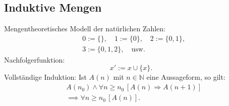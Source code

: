 \subsection{Induktive Mengen}
Mengentheoretisches Modell der natürlichen Zahlen:
\begin{equation}
\begin{split}
& 0:=\{\},\quad 1:=\{0\},\quad 2:=\{0,1\},\\
& 3:=\{0,1,2\},\quad \text{usw.}
\end{split}
\end{equation}
Nachfolgerfunktion:
\begin{equation}
x' := x\cup\{x\}.
\end{equation}
Vollständige Induktion: Ist $A(n)$ mit $n\in\mathbb N$
eine Aussageform, so gilt:
\begin{equation}
\begin{split}
& A(n_0)\land \forall n\ge n_0\,[A(n)\Rightarrow A(n+1)]\\
& \implies \forall n\ge n_0\,[A(n)].
\end{split}
\end{equation}

